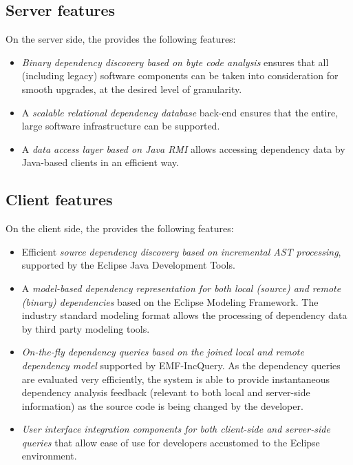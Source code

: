 \subsection{Server features}
On the server side, the \ptool{} provides the following features:
\begin{itemize}
  \item \emph{Binary dependency discovery based on byte code analysis} ensures
  that all (including legacy) software components can be taken into
  consideration for smooth upgrades, at the desired level of granularity.
  \item A \emph{scalable relational dependency database} back-end ensures that
  the entire, large software infrastructure can be supported.
  \item A \emph{data access layer based on Java RMI} allows accessing dependency
  data by Java-based clients in an efficient way.
\end{itemize}

\subsection{Client features}
On the client side, the \ptool{} provides the following features:
\begin{itemize}
  \item Efficient \emph{source dependency discovery based on incremental AST
  processing}, supported by the Eclipse Java Development Tools.
  \item A \emph{model-based dependency representation for both local (source)
  and remote (binary) dependencies} based on the Eclipse Modeling Framework. The
  industry standard modeling format allows the processing of dependency data by
  third party modeling tools.
  \item \emph{On-the-fly dependency queries based on the joined local and remote
  dependency model} supported by EMF-IncQuery. As the dependency queries are
  evaluated very efficiently, the system is able to provide instantaneous
  dependency analysis feedback (relevant to both local and server-side
  information) as the source code is being changed by the developer.
  \item \emph{User interface integration components for both client-side and
  server-side queries} that allow ease of use for developers accustomed to the
  Eclipse environment.
\end{itemize}

